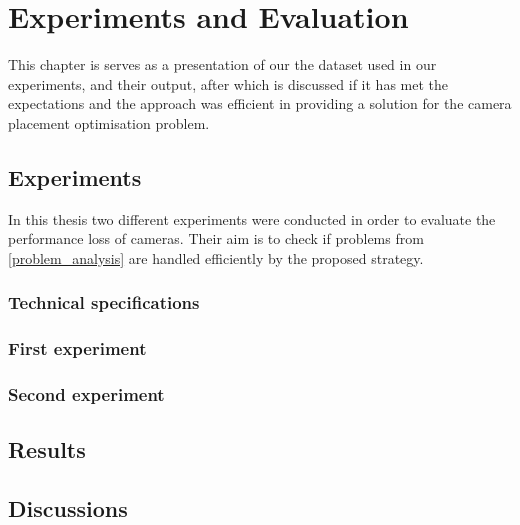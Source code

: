 \chapter{Experiments and Evaluation}
\label{evaluation}

This chapter is serves as a presentation of our the dataset used in our experiments, and their output, after which is discussed if it has met the expectations and the approach was efficient in providing a solution for the camera placement optimisation problem.

\section{Experiments}
In this thesis two different experiments were conducted in order to evaluate the performance loss of cameras. Their aim is to check if problems from \ref{problem_analysis} are handled efficiently by the proposed strategy.
\subsection{Technical specifications}
\subsection{First experiment}
\subsection{Second experiment}

\section{Results}
\label{results}

\section{Discussions}
\label{discussions}